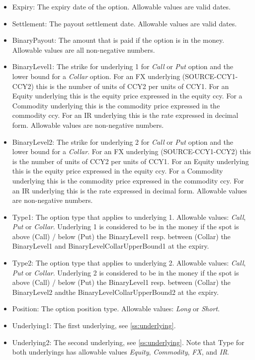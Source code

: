 \begin{itemize}
\item Expiry: The expiry date of the option. Allowable values are valid dates.
\item Settlement: The payout settlement date. Allowable values are valid dates.
\item BinaryPayout: The amount that is paid if the option is in the money. Allowable values are all non-negative numbers.
\item BinaryLevel1: The strike for underlying 1 for {\em Call} or {\em Put} option and the lower bound for a {\em Collar} option. For an FX underlying (SOURCE-CCY1-CCY2) this is the number of units of
  CCY2 per units of CCY1. For an Equity underlying this is the equity price expressed in the equity ccy.  For a Commodity underlying this is the commodity price expressed in the commodity ccy. For an IR underlying this is the rate expressed in decimal form. Allowable values
  are non-negative numbers.
\item BinaryLevel2: The strike for underlying 2 for {\em Call} or {\em Put} option and the lower bound for a {\em Collar}. For an FX underlying (SOURCE-CCY1-CCY2) this is the number of units of
  CCY2 per units of CCY1. For an Equity underlying this is the equity price expressed in the equity ccy.  For a Commodity underlying this is the commodity price expressed in the commodity ccy. For an IR underlying this is the rate expressed in decimal form. Allowable values
  are non-negative numbers.
\item Type1: The option type that applies to underlying 1. Allowable values: {\em Call}, {\em Put} or {\em Collar}. Underlying 1 is
  considered to be in the money if the spot is above (Call) / below (Put) the BinaryLevel1 resp. between (Collar) the BinaryLevel1 and BinaryLevelCollarUpperBound1 at the expiry. 
\item Type2: The option type that applies to underlying 2. Allowable values: {\em Call}, {\em Put} or {\em Collar}. Underlying 2 is
  considered to be in the money if the spot is above (Call) / below (Put) the BinaryLevel1 resp. between (Collar) the BinaryLevel2 andthe  BinaryLevelCollarUpperBound2 at the expiry. 
\item Position: The option position type. Allowable values: {\em Long} or {\em Short}.
\item Underlying1: The first underlying, see \ref{ss:underlying}. 
\item Underlying2: The second underlying, see \ref{ss:underlying}. Note that Type for both underlyings has allowable values \emph{Equity}, \emph{Commodity}, \emph{FX}, and \emph{IR}.

\end{itemize}
